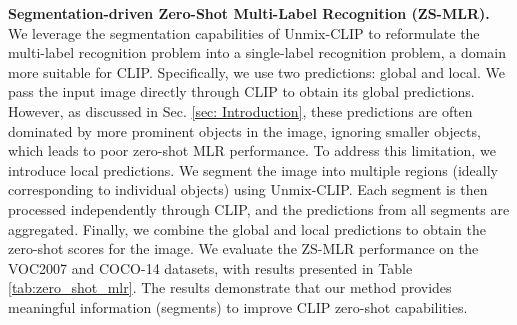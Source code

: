 \textbf{Segmentation-driven Zero-Shot Multi-Label Recognition (ZS-MLR).} We leverage the segmentation capabilities of Unmix-CLIP to reformulate the multi-label recognition problem into a single-label recognition problem, a domain more suitable for CLIP. Specifically, we use two predictions: global and local. We pass the input image directly through CLIP to obtain its global predictions. However, as discussed in Sec. \ref{sec: Introduction}, these predictions are often dominated by more prominent objects in the image, ignoring smaller objects, which leads to poor zero-shot MLR performance. To address this limitation, we introduce local predictions. We segment the image into multiple regions (ideally corresponding to individual objects) using Unmix-CLIP. Each segment is then processed independently through CLIP, and the predictions from all segments are aggregated. Finally, we combine the global and local predictions to obtain the zero-shot scores for the image.
% 
We evaluate the ZS-MLR performance on the VOC2007 and COCO-14 datasets, with results presented in Table \ref{tab:zero_shot_mlr}. The results demonstrate that our method provides meaningful information (segments) to improve CLIP zero-shot capabilities.


